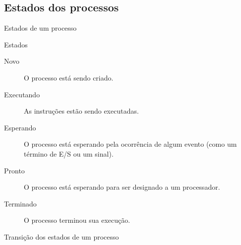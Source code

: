 \subsection{Estados dos processos}

\begin{frame}{Estados de um processo}
  
\begin{block}{Estados}
  \begin{description}
  \item[Novo] O processo está sendo criado.
  \item[Executando] As instruções estão sendo executadas.
  \item[Esperando] O processo está esperando pela ocorrência de algum
    evento (como um término de E/S ou um sinal).
  \item[Pronto] O processo está esperando para ser designado a um processador.
  \item[Terminado] O processo terminou sua execução.
  \end{description}
\end{block}

\end{frame}

\begin{frame}[fragile]{Transição dos estados de um processo}
  
	

\end{frame}

